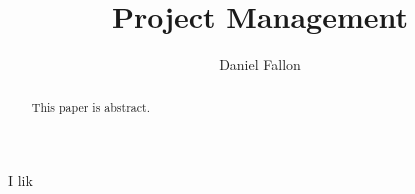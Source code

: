 \documentclass[conference]{IEEEtran}
\title{Project Management\\\normalsize{}}
\author{Daniel Fallon}
\begin{document}
\maketitle

\begin{abstract}
This paper is abstract.
\end{abstract}

I lik \cite{hc_washingtonpost}


\end{document}
